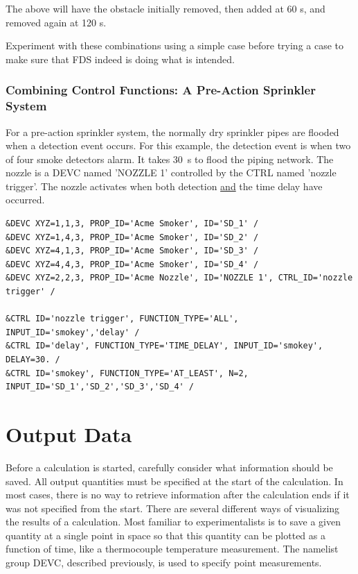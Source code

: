 \documentclass[11pt]{book}
\begin{document}
\normalsize
\noindent
The above will have the obstacle initially removed, then added at 60 s, and removed again at 120 s.

Experiment with these combinations using a simple
case before trying a case to make sure that FDS indeed is doing what is intended.


\subsection{Combining Control Functions: A Pre-Action Sprinkler System}

For a pre-action sprinkler system, the normally
dry sprinkler pipes are flooded when a detection event occurs. For this example, the detection event is
when two of four smoke detectors alarm.  It takes 30~s to flood the piping network.
The nozzle is a {\ct DEVC} named {\ct 'NOZZLE 1'} controlled by the {\ct CTRL} named {\ct 'nozzle trigger'}.
The nozzle activates when both detection \underline{and} the time delay have occurred.

\footnotesize
\begin{verbatim}
&DEVC XYZ=1,1,3, PROP_ID='Acme Smoker', ID='SD_1' /
&DEVC XYZ=1,4,3, PROP_ID='Acme Smoker', ID='SD_2' /
&DEVC XYZ=4,1,3, PROP_ID='Acme Smoker', ID='SD_3' /
&DEVC XYZ=4,4,3, PROP_ID='Acme Smoker', ID='SD_4' /
&DEVC XYZ=2,2,3, PROP_ID='Acme Nozzle', ID='NOZZLE 1', CTRL_ID='nozzle trigger' /

&CTRL ID='nozzle trigger', FUNCTION_TYPE='ALL', INPUT_ID='smokey','delay' /
&CTRL ID='delay', FUNCTION_TYPE='TIME_DELAY', INPUT_ID='smokey', DELAY=30. /
&CTRL ID='smokey', FUNCTION_TYPE='AT_LEAST', N=2, INPUT_ID='SD_1','SD_2','SD_3','SD_4' /
\end{verbatim}
\normalsize









\chapter{Output Data}
\label{info:outputdata}

Before a calculation is started, carefully consider
what information should be saved. All output quantities must be specified
at the start of the calculation. In most cases, there is no way to
retrieve information after the calculation ends if it was not specified from the start.
There are several different ways of visualizing the results of a
calculation. Most familiar to
experimentalists is to save a given quantity at a single point in space so
that this quantity can be plotted as a function of time, like a
thermocouple temperature measurement. The namelist group {\ct DEVC},
described previously, is used to specify point measurements.
\end{document}
